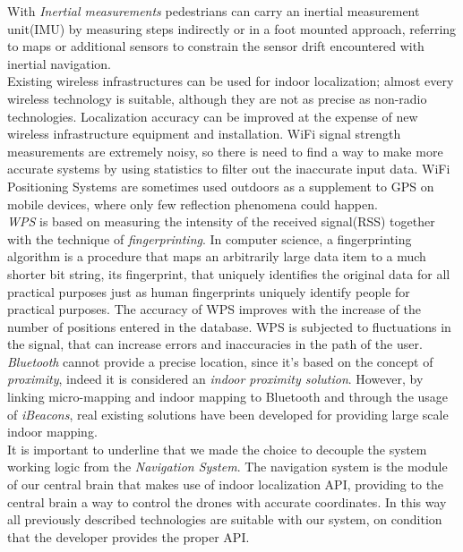 With \textit{Inertial measurements}\cite{IMU} pedestrians can carry an inertial measurement unit(IMU) by measuring steps indirectly or in a foot mounted approach, referring to maps or additional sensors to constrain the sensor drift encountered with inertial navigation.
\\

Existing wireless infrastructures can be used for indoor localization; almost every wireless technology is suitable, although they are not as precise as non-radio technologies.
Localization accuracy can be improved at the expense of new wireless infrastructure equipment and installation.
WiFi signal strength measurements are extremely noisy, so there is need to find a way to make more accurate systems by using statistics to filter out the inaccurate input data. WiFi Positioning Systems are sometimes used outdoors as a supplement to GPS on mobile devices, where only few reflection phenomena could happen.
\\

\textit{WPS}\cite{WPS} is based on measuring the intensity of the received signal(RSS) together with the technique of \textit{fingerprinting}.
In computer science, a fingerprinting algorithm is a procedure that maps an arbitrarily large data item to a much shorter bit string, its fingerprint, that uniquely identifies the original data for all practical purposes just as human fingerprints uniquely identify people for practical purposes.
The accuracy of WPS improves with the increase of the number of positions entered in the database.
WPS is subjected to fluctuations in the signal, that can increase errors and inaccuracies in the path of the user.
\\

\textit{Bluetooth}\cite{bluetooth} cannot provide a precise location, since it's based on the concept of \textit{proximity}, indeed it is considered an \textit{indoor proximity solution}.
However, by linking micro-mapping and indoor mapping to Bluetooth and through the usage of \textit{iBeacons}, real existing solutions have been developed for providing large scale indoor mapping.
\\

It is important to underline that we made the choice to decouple the system working logic from the \textit{Navigation System}. The navigation system is the module of our central brain that makes use of indoor localization API, providing to the central brain a way to control the drones with accurate coordinates. In this way all previously described technologies are suitable with our system, on condition that the developer provides the proper API.
\\

